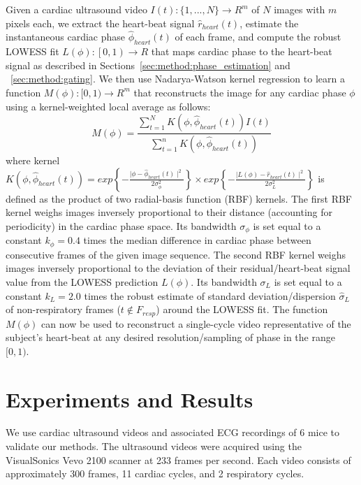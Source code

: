 \documentclass[runningheads,a4paper]{llncs}
\begin{document}
Given a cardiac ultrasound video $I(t) : \{1, ..., N\} \to R^m$ of $N$ images with $m$ pixels each, we extract the heart-beat signal $\hat{r}_{heart}(t)$, estimate the instantaneous cardiac phase $\hat{\phi}_{heart}(t)$ of each frame, and compute the robust LOWESS fit $L(\phi) : \left [  0, 1\right ) \to R$ that maps cardiac phase to the heart-beat signal as described in Sections~\ref{sec:method:phase_estimation} and ~\ref{sec:method:gating}. We then use Nadarya-Watson kernel regression\cite{Bishop2006} to learn a function $M(\phi): [0, 1) \to R^m $ that reconstructs the image for any cardiac phase $\phi$ using a kernel-weighted local average as follows:
\begin{equation}
M(\phi) = \frac{\sum_{t = 1}^{N} K \left( \phi, \hat{\phi}_{heart}(t) \right) I(t)}{\sum_{t = 1}^{n} K \left( \phi, \hat{\phi}_{heart}(t) \right)} 
\end{equation}
where kernel $K\left( \phi, \hat{\phi}_{heart}(t) \right) = exp\left \{ -\frac{ \mid \phi - \hat{\phi}_{heart}(t) \mid^2}{2  \sigma^2_\phi} \right \} \times exp\left \{ -\frac{ \mid L(\phi) - \hat{r}_{heart}(t) \mid^2}{2  \sigma^2_{L}} \right \}$ is defined as the product of two radial-basis function (RBF) kernels. The first RBF kernel  weighs images inversely proportional to their distance (accounting for periodicity) in the cardiac phase space. Its bandwidth $\sigma_\phi$ is set equal to a constant $k_\phi = 0.4$ times the median difference in cardiac phase between consecutive frames of the given image sequence. The second RBF kernel weighs images inversely proportional to the deviation of their residual/heart-beat signal value from the LOWESS prediction $L(\phi)$. Its bandwidth $\sigma_{L}$ is set equal to a constant $k_L = 2.0$ times the robust estimate of standard deviation/dispersion $\hat{\sigma}_{L}$ of non-respiratory frames ($t \notin F_{resp}$) around the LOWESS fit. The function $M(\phi)$ can now be used to reconstruct a single-cycle video representative of the subject's heart-beat at any desired resolution/sampling of phase in the range $[0, 1)$. 
%
\vspace{-0.3cm}
\section{Experiments and Results}
\label{sec:results}
\vspace{-0.3cm}
%
We use cardiac ultrasound videos and associated ECG recordings of 6 mice to validate our methods. The ultrasound videos were acquired using the VisualSonics Vevo 2100 scanner at 233 frames per second. Each video consists of approximately 300 frames, 11 cardiac cycles, and 2 respiratory cycles.
\end{document}
